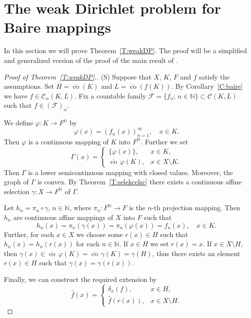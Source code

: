 \documentclass{amsart}
\numberwithin{equation}{section}
\theoremstyle{definition}
\def\C{\mathcal C}
\def\F{\mathcal F}
\def\co{\operatorname{co}}
\def\en{\mathbb N}
\def\ov{\overline}
\newcommand{\setsep}{;\,}
\begin{document}
\section{The weak Dirichlet problem for Baire mappings}\label{Sec:wdp}

In this section we will prove Theorem~\ref{T:weakDP}. The proof will be a simplified and generalized version of the proof of the main result of \cite{spurny-wdp}.


\begin{proof}[Proof of Theorem~\ref{T:weakDP}.]
(S) Suppose that $X$, $K$, $F$ and $f$ satisfy the assumptions. Set $H=\ov{\co}(K)$ and $L=\ov{\co}(f(K))$.
By Corollary~\ref{C:baire} we have $f\in\C_\alpha(K,L)$. Fix a countable family $\F=\{f_n\setsep n\in\en\}\subset\C(K,L)$
such that $f\in(\F)_\alpha$.

We define $\varphi\colon K\to F^\en$ by
\[
\varphi(x)=(f_n(x))_{n=1}^\infty,\quad x\in K.
\]
Then $\varphi$ is a continuous mapping of $K$ into $F^\en$.  Further we set
\[
\Gamma(x)=\begin{cases} \{\varphi(x)\}, & x\in K,\\ \ov{\co}\, \varphi(K),& x\in X\setminus K. \end{cases}
\]
Then $\Gamma$ is a  lower semicontinuous mapping with closed values. Moreover, the graph of $\Gamma$ is convex. By Theorem~\ref{T:selekcelsc} there exists a continuous
affine  selection $\gamma\colon X\to F^\en$ of $\Gamma$.

Let $h_n=\pi_n\circ \gamma$, $n\in\en$, where $\pi_n\colon F^\en\to F$ is the $n$-th projection mapping. Then $h_n$ are continuous affine mappings of $X$ into $F$ such that
\[
h_n(x)=\pi_n(\gamma(x))=\pi_n(\varphi(x))=f_n(x),\quad x\in K.
\]
Further, for each $x\in X$ we choose some $r(x)\in H$ such that $h_n(x)=h_n(r(x))$ for each $n\in\en$. If $x\in H$ we set $r(x)=x$. If $x\in X \setminus H$, then $\gamma(x)\in\ov{\co}\,\varphi(K)=\ov{\co}\,\gamma(K)=\gamma(H)$, thus there exists an element $r(x)\in H$ such that $\gamma(x)=\gamma(r(x))$.

Finally, we can construct the required extension by
\begin{equation}
\label{eq:rozsireni}
\hat{f}(x)=\begin{cases} \delta_x(f), & x\in H,\\ \hat{f}(r(x)), & x\in X\setminus H.\end{cases}\end{equation}


\end{proof}
\end{document}
